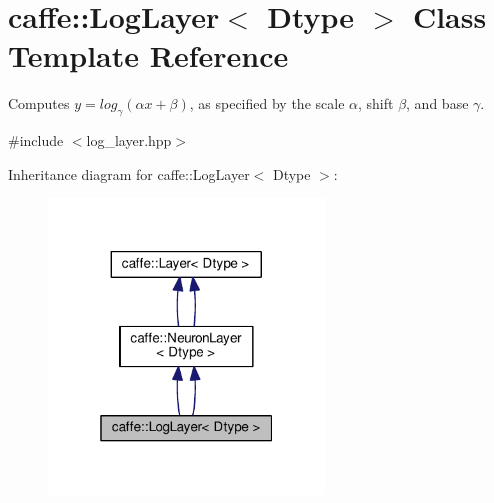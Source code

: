 \hypertarget{classcaffe_1_1_log_layer}{}\section{caffe\+:\+:Log\+Layer$<$ Dtype $>$ Class Template Reference}
\label{classcaffe_1_1_log_layer}


Computes $ y = log_{\gamma}(\alpha x + \beta) $, as specified by the scale $ \alpha $, shift $ \beta $, and base $ \gamma $.  




{\ttfamily \#include $<$log\+\_\+layer.\+hpp$>$}



Inheritance diagram for caffe\+:\+:Log\+Layer$<$ Dtype $>$\+:
\nopagebreak
\begin{figure}[H]
\begin{center}
\leavevmode
\includegraphics[width=208pt]{classcaffe_1_1_log_layer__inherit__graph}
\end{center}
\end{figure}
